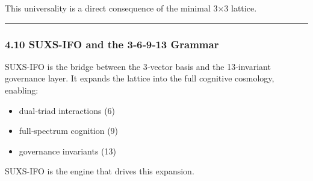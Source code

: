This universality is a direct consequence of the minimal 3×3 lattice.

\begin{center}\rule{0.5\linewidth}{0.5pt}\end{center}

\subsubsection{4.10 SUXS-IFO and the 3‑6‑9‑13 Grammar}\label{suxs-ifo-and-the-36913-grammar}

SUXS-IFO is the bridge between the 3‑vector basis and the 13‑invariant governance layer. It expands the lattice into the full cognitive cosmology, enabling:

\begin{itemize}
\tightlist
\item
  dual‑triad interactions (6)\\
\item
  full‑spectrum cognition (9)\\
\item
  governance invariants (13)
\end{itemize}

SUXS-IFO is the engine that drives this expansion.
